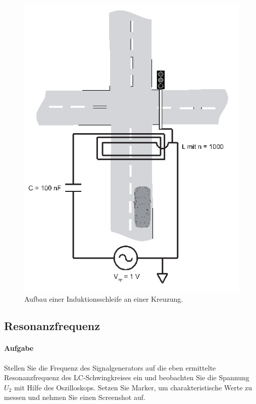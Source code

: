 \documentclass[10pt]{report}
\begin{document}
        \begin{center}
            \begin{figure}[H]
                \includegraphics[width=\textwidth]{Abbildung19.png}
                \caption{Aufbau einer Induktionsschleife an einer Kreuzung.}
                \label{fig:abb19}
            \end{figure}
        \end{center}

        \subsection{Resonanzfrequenz}
        \paragraph{Aufgabe}
        Stellen Sie die Frequenz des Signalgenerators auf die eben ermittelte Resonanzfrequenz
        des LC-Schwingkreises ein und beobachten Sie die Spannung $U_2$ mit Hilfe des
        Oszilloskops. Setzen Sie Marker, um charakteristische Werte zu messen und nehmen
        Sie einen Screenshot auf.
\end{document}
